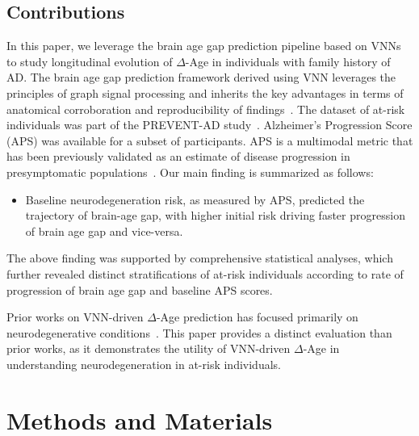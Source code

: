 \documentclass[conference]{IEEEtran}
\begin{document}
\subsection{Contributions}
In this paper, we leverage the brain age gap prediction pipeline based on VNNs to study longitudinal evolution of $\Delta$-Age in individuals with family history of AD. The brain age gap prediction framework derived using VNN leverages the principles of graph signal processing and inherits the key advantages in terms of anatomical corroboration and reproducibility of findings~\cite{sihag2025disentangling}. The dataset of at-risk individuals was part of the PREVENT-AD study~\cite{tremblay2021open}. Alzheimer's Progression Score (APS) was available for a subset of participants. APS is a multimodal metric that has been previously validated as an estimate of disease progression in presymptomatic populations~\cite{leoutsakos2016alzheimer}. Our main finding is summarized as follows:
\begin{itemize}
    \item Baseline neurodegeneration risk, as measured by APS, predicted the trajectory of brain-age gap, with higher initial risk driving faster progression of brain age gap and vice-versa.
\end{itemize}
The above finding was supported by comprehensive statistical analyses, which further revealed distinct stratifications of at-risk individuals according to rate of progression of brain age gap and baseline APS scores.

Prior works on VNN-driven $\Delta$-Age prediction has focused primarily on neurodegenerative conditions~\cite{sihag2025disentangling, sihag2022predicting,sihag2023explainable,sihagJSTSP,sihagisbi}. This paper provides a distinct evaluation than prior works, as it demonstrates the utility of VNN-driven $\Delta$-Age in understanding neurodegeneration in at-risk individuals.

\section{Methods and Materials}
\end{document}
